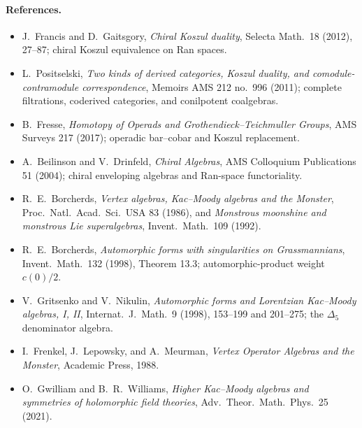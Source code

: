 \paragraph{References.}
\begin{itemize}
  \item J.\ Francis and D.\ Gaitsgory, \emph{Chiral Koszul duality},
    Selecta Math.\ 18 (2012), 27--87; chiral Koszul equivalence on
    Ran spaces.
  \item L.\ Positselski, \emph{Two kinds of derived categories, Koszul
    duality, and comodule-contramodule correspondence}, Memoirs AMS
    212 no.~996 (2011); complete filtrations, coderived categories,
    and conilpotent coalgebras.
  \item B.\ Fresse, \emph{Homotopy of Operads and
    Grothendieck--Teichmuller Groups}, AMS Surveys 217 (2017);
    operadic bar--cobar and Koszul replacement.
  \item A.\ Beilinson and V.\ Drinfeld, \emph{Chiral Algebras},
    AMS Colloquium Publications 51 (2004); chiral enveloping algebras
    and Ran-space functoriality.
  \item R.\ E.\ Borcherds, \emph{Vertex algebras, Kac--Moody algebras
    and the Monster}, Proc.\ Natl.\ Acad.\ Sci.\ USA 83 (1986), and
    \emph{Monstrous moonshine and monstrous Lie superalgebras},
    Invent.\ Math.\ 109 (1992).
  \item R.\ E.\ Borcherds, \emph{Automorphic forms with singularities
    on Grassmannians}, Invent.\ Math.\ 132 (1998), Theorem 13.3;
    automorphic-product weight $c(0)/2$.
  \item V.\ Gritsenko and V.\ Nikulin, \emph{Automorphic forms and
    Lorentzian Kac--Moody algebras, I, II}, Internat.\ J.\ Math.\ 9
    (1998), 153--199 and 201--275; the $\Delta_5$ denominator
    algebra.
  \item I.\ Frenkel, J.\ Lepowsky, and A.\ Meurman, \emph{Vertex
    Operator Algebras and the Monster}, Academic Press, 1988.
  \item O.\ Gwilliam and B.\ R.\ Williams, \emph{Higher Kac--Moody
    algebras and symmetries of holomorphic field theories},
    Adv.\ Theor.\ Math.\ Phys.\ 25 (2021).
\end{itemize}
